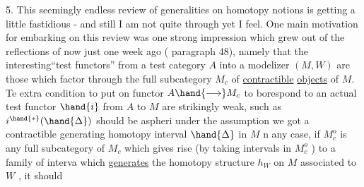 
5. This seemingly endless review of generalities on homotopy notions
is getting a little fastidious - and still I am not quite through yet
I feel. One main motivation for embarking on this review was one strong
impression which grew out of the reflections of now just one week ago
( paragraph 48), namely that the interesting``test functors'' from a
test category $A$ into a modelizer $(M,W)$ are those which factor through
the full subcategory $M_c$ of \uline{contractible} \uline{objects} of $M$. Te  extra condition
to put on   functor $A \hand{\longrightarrow} M_c$ to borespond to an actual test functor $\hand{i}$
from $A$ to $M$ are strikingly weak, such as\hand{:} $i^{\hand{*}}(\hand{\Delta})$ should be  aspheri
  under the assumption we got a contractible generating homotopy interval
$\hand{\Delta}$ in $M$  n any case, if $M^o_c$ is any full subcategory of $M_c$ which 
gives rise (by taking intervals in $M^o_c$ ) to a  family of  interva
which \uline{generates} the homotopy structure $h_W$ on $M$ associated to $W$ , it should

